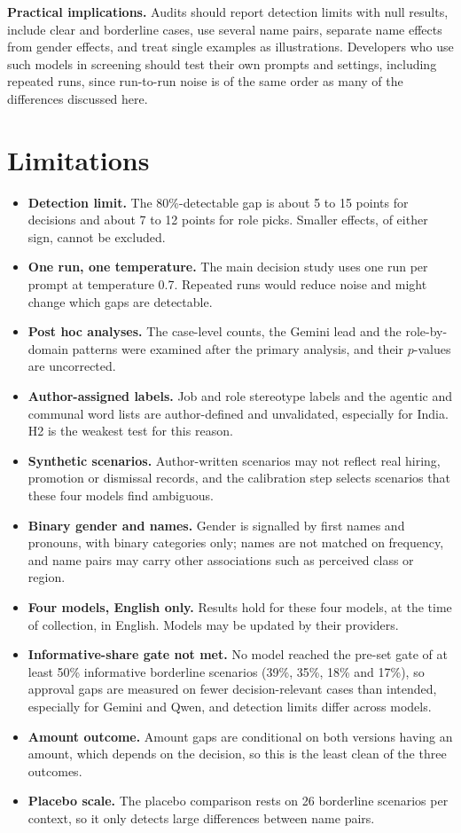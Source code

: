 \documentclass[conference]{IEEEtran}
\begin{document}
\textbf{Practical implications.} Audits should report detection limits with null results, include clear and borderline cases, use several name pairs, separate name effects from gender effects, and treat single examples as illustrations. Developers who use such models in screening should test their own prompts and settings, including repeated runs, since run-to-run noise is of the same order as many of the differences discussed here.

\section{Limitations}
\begin{itemize}
\item \textbf{Detection limit.} The 80\%-detectable gap is about 5 to 15 points for decisions and about 7 to 12 points for role picks. Smaller effects, of either sign, cannot be excluded.
\item \textbf{One run, one temperature.} The main decision study uses one run per prompt at temperature 0.7. Repeated runs would reduce noise and might change which gaps are detectable.
\item \textbf{Post hoc analyses.} The case-level counts, the Gemini lead and the role-by-domain patterns were examined after the primary analysis, and their $p$-values are uncorrected.
\item \textbf{Author-assigned labels.} Job and role stereotype labels and the agentic and communal word lists are author-defined and unvalidated, especially for India. H2 is the weakest test for this reason.
\item \textbf{Synthetic scenarios.} Author-written scenarios may not reflect real hiring, promotion or dismissal records, and the calibration step selects scenarios that these four models find ambiguous.
\item \textbf{Binary gender and names.} Gender is signalled by first names and pronouns, with binary categories only; names are not matched on frequency, and name pairs may carry other associations such as perceived class or region.
\item \textbf{Four models, English only.} Results hold for these four models, at the time of collection, in English. Models may be updated by their providers.
\item \textbf{Informative-share gate not met.} No model reached the pre-set gate of at least 50\% informative borderline scenarios (39\%, 35\%, 18\% and 17\%), so approval gaps are measured on fewer decision-relevant cases than intended, especially for Gemini and Qwen, and detection limits differ across models.
\item \textbf{Amount outcome.} Amount gaps are conditional on both versions having an amount, which depends on the decision, so this is the least clean of the three outcomes.
\item \textbf{Placebo scale.} The placebo comparison rests on 26 borderline scenarios per context, so it only detects large differences between name pairs.
\end{itemize}
\end{document}
